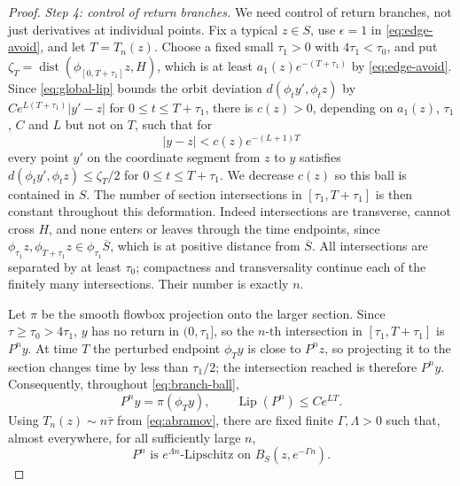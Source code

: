 \documentclass[12pt]{article}
\theoremstyle{remark}
\newcommand{\dist}{\operatorname{dist}}
\newcommand{\Lip}{\operatorname{Lip}}
\begin{document}
\begin{proof}
\emph{Step 4: control of return branches.}
We need control of return branches, not just derivatives at individual
points.  Fix a typical \(z\in S\), use \(\epsilon=1\) in
\eqref{eq:edge-avoid}, and let \(T=T_n(z)\).
Choose a fixed small \(\tau_1>0\) with \(4\tau_1<\tau_0\), and put
\(\zeta_T=\dist(\phi_{[0,T+\tau_1]}z,H)\), which is at least
\(a_1(z)e^{-(T+\tau_1)}\) by \eqref{eq:edge-avoid}.
Since \eqref{eq:global-lip} bounds the orbit deviation
\(d(\phi_ty',\phi_tz)\) by \(Ce^{L(T+\tau_1)}|y'-z|\) for
\(0\le t\le T+\tau_1\), there is \(c(z)>0\), depending on
\(a_1(z)\), \(\tau_1\), \(C\) and \(L\) but not on \(T\), such that for
\begin{equation}\label{eq:branch-ball}
 |y-z|<c(z)e^{-(L+1)T}
\end{equation}
every point \(y'\) on the coordinate segment from \(z\) to \(y\)
satisfies \(d(\phi_ty',\phi_tz)\le\zeta_T/2\) for
\(0\le t\le T+\tau_1\).
We decrease \(c(z)\) so this ball is contained in \(S\).
The number of section intersections in \([\tau_1,T+\tau_1]\) is then
constant throughout this deformation.  Indeed intersections are
transverse, cannot cross \(H\), and none enters or leaves through
the time endpoints, since
\(\phi_{\tau_1}z,\phi_{T+\tau_1}z\in\phi_{\tau_1}\overline S\), which
is at positive distance from \(\overline S\).
All intersections are separated by at least \(\tau_0\);
compactness and transversality continue each of the finitely many
intersections.  Their number is exactly \(n\).

Let \(\pi\) be the smooth flowbox projection onto the larger section.
Since \(\tau\ge\tau_0>4\tau_1\), \(y\) has no return in
\((0,\tau_1]\), so the \(n\)-th intersection in \([\tau_1,T+\tau_1]\)
is \(P^ny\).  At time \(T\) the perturbed endpoint \(\phi_Ty\) is
close to \(P^nz\), so projecting it to the section changes time by
less than \(\tau_1/2\); the intersection reached is therefore
\(P^ny\).  Consequently, throughout
\eqref{eq:branch-ball},
\[
 P^ny=\pi(\phi_Ty),\qquad
 \Lip(P^n)\le C e^{LT}.
\]
Using \(T_n(z)\sim n\bar\tau\) from \eqref{eq:abramov}, there are
fixed finite \(\Gamma,\Lambda>0\)
such that, almost everywhere, for all sufficiently large \(n\),
\begin{equation}\label{eq:reasonable}
 P^n\text{ is }e^{\Lambda n}\text{-Lipschitz on }
                    B_S(z,e^{-\Gamma n}).
\end{equation}


\end{proof}
\end{document}
